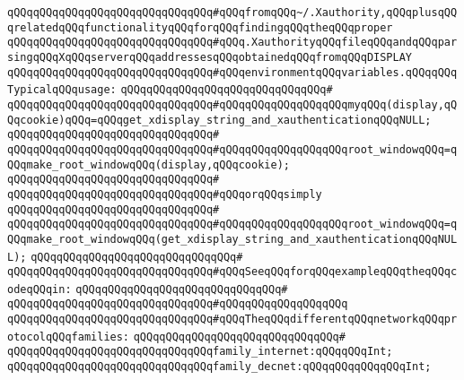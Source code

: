 \verb|qQQqqQQqqQQqqQQqqQQqqQQqqQQqqQQq#qQQqfromqQQq~/.Xauthority,qQQqplusqQQqrelatedqQQqfunctionalityqQQqforqQQqfindingqQQqtheqQQqproper|\newline
\verb|qQQqqQQqqQQqqQQqqQQqqQQqqQQqqQQq#qQQq.XauthorityqQQqfileqQQqandqQQqparsingqQQqXqQQqserverqQQqaddressesqQQqobtainedqQQqfromqQQqDISPLAY|\newline
\verb|qQQqqQQqqQQqqQQqqQQqqQQqqQQqqQQq#qQQqenvironmentqQQqvariables.qQQqqQQqTypicalqQQqusage:|\newline
\verb|qQQqqQQqqQQqqQQqqQQqqQQqqQQqqQQq#|\newline
\verb|qQQqqQQqqQQqqQQqqQQqqQQqqQQqqQQq#qQQqqQQqqQQqqQQqqQQqmyqQQq(display,qQQqcookie)qQQq=qQQqget_xdisplay_string_and_xauthenticationqQQqNULL;|\newline
\verb|qQQqqQQqqQQqqQQqqQQqqQQqqQQqqQQq#|\newline
\verb|qQQqqQQqqQQqqQQqqQQqqQQqqQQqqQQq#qQQqqQQqqQQqqQQqqQQqroot_windowqQQq=qQQqmake_root_windowqQQq(display,qQQqcookie);|\newline
\verb|qQQqqQQqqQQqqQQqqQQqqQQqqQQqqQQq#|\newline
\verb|qQQqqQQqqQQqqQQqqQQqqQQqqQQqqQQq#qQQqorqQQqsimply|\newline
\verb|qQQqqQQqqQQqqQQqqQQqqQQqqQQqqQQq#|\newline
\verb|qQQqqQQqqQQqqQQqqQQqqQQqqQQqqQQq#qQQqqQQqqQQqqQQqqQQqroot_windowqQQq=qQQqmake_root_windowqQQq(get_xdisplay_string_and_xauthenticationqQQqNULL);|\newline
\verb|qQQqqQQqqQQqqQQqqQQqqQQqqQQqqQQq#|\newline
\verb|qQQqqQQqqQQqqQQqqQQqqQQqqQQqqQQq#qQQqSeeqQQqforqQQqexampleqQQqtheqQQqcodeqQQqin:|\newline
\verb|qQQqqQQqqQQqqQQqqQQqqQQqqQQqqQQq#|\newline
\verb|qQQqqQQqqQQqqQQqqQQqqQQqqQQqqQQq#qQQqqQQqqQQqqQQqqQQq|\newline
\newline
\verb|qQQqqQQqqQQqqQQqqQQqqQQqqQQqqQQq#qQQqTheqQQqdifferentqQQqnetworkqQQqprotocolqQQqfamilies:|\newline
\verb|qQQqqQQqqQQqqQQqqQQqqQQqqQQqqQQq#|\newline
\verb|qQQqqQQqqQQqqQQqqQQqqQQqqQQqqQQqfamily_internet:qQQqqQQqInt;|\newline
\verb|qQQqqQQqqQQqqQQqqQQqqQQqqQQqqQQqfamily_decnet:qQQqqQQqqQQqqQQqInt;|\newline
